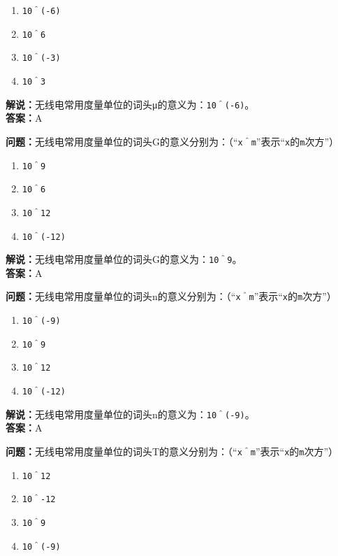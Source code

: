 \begin{enumerate}[label=\Alph*), leftmargin=1cm]
	\item \texttt{10＾(-6)}
	\item \texttt{10＾6}
	\item \texttt{10＾(-3)}
	\item \texttt{10＾3}
\end{enumerate}

\textbf{解说：}无线电常用度量单位的词头μ的意义为：\texttt{10＾(-6)}。\\\textbf{答案：}A



\textbf{问题：}无线电常用度量单位的词头G的意义分别为：（“\texttt{x＾m}”表示“\texttt{x}的\texttt{m}次方”）

\begin{enumerate}[label=\Alph*), leftmargin=1cm]
	\item \texttt{10＾9}
	\item \texttt{10＾6}
	\item \texttt{10＾12}
	\item \texttt{10＾(-12)}
\end{enumerate}

\textbf{解说：}无线电常用度量单位的词头G的意义为：\texttt{10＾9}。\\\textbf{答案：}A



\textbf{问题：}无线电常用度量单位的词头n的意义分别为：（“\texttt{x＾m}”表示“\texttt{x}的\texttt{m}次方”）

\begin{enumerate}[label=\Alph*), leftmargin=1cm]
	\item \texttt{10＾(-9)}
	\item \texttt{10＾9}
	\item \texttt{10＾12}
	\item \texttt{10＾(-12)}
\end{enumerate}

\textbf{解说：}无线电常用度量单位的词头n的意义为：\texttt{10＾(-9)}。\\\textbf{答案：}A



\textbf{问题：}无线电常用度量单位的词头T的意义分别为：（“\texttt{x＾m}”表示“\texttt{x}的\texttt{m}次方”）

\begin{enumerate}[label=\Alph*), leftmargin=1cm]
	\item \texttt{10＾12}
	\item \texttt{10＾-12}
	\item \texttt{10＾9}
	\item \texttt{10＾(-9)}
\end{enumerate}

